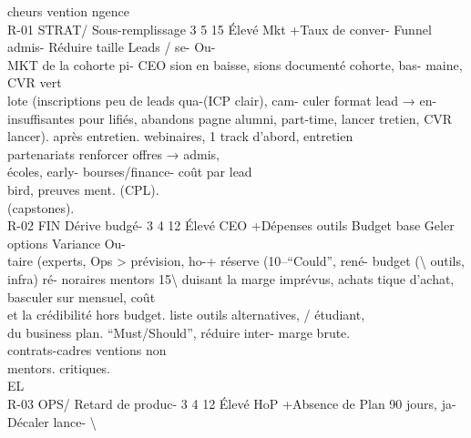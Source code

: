 \documentclass[12pt,landscape,a4paper]{article}
\begin{document}
cheurs           vention           ngence\\
R-01   STRAT/   Sous-remplissage 3 5 15 Élevé Mkt     +Taux de conver- Funnel      admis- Réduire      taille Leads / se- Ou-\\
MKT      de la cohorte pi-             CEO      sion en baisse, sions documenté cohorte,          bas- maine, CVR vert\\
lote (inscriptions                     peu de leads qua-(ICP clair), cam- culer      format lead → en-\\
insuffisantes pour                     lifiés, abandons pagne     alumni, part-time, lancer tretien, CVR\\
lancer).                               après entretien. webinaires,       1 track d’abord, entretien\\
partenariats       renforcer offres →        admis,\\
écoles,     early- bourses/finance- coût par lead\\
bird,    preuves ment.                (CPL).\\
(capstones).\\
R-02   FIN      Dérive      budgé- 3 4 12 Élevé CEO   +Dépenses outils Budget        base Geler       options Variance       Ou-\\
taire    (experts,              Ops    \textgreater{} prévision, ho-+ réserve (10–“Could”,            rené- budget (\textbackslash{}%
outils, infra) ré-                     noraires mentors 15\textbackslash{}%
duisant la marge                       imprévus, achats tique     d’achat, basculer        sur mensuel, coût\\
et la crédibilité                      hors budget.     liste       outils alternatives,       /   étudiant,\\
du business plan.                                       “Must/Should”, réduire          inter- marge brute.\\
contrats-cadres ventions          non\\
mentors.           critiques.\\
\vspace{0.5em}
\vspace{0.5em}
\vspace{0.5em}
\vspace{0.5em}
EL\\
R-03   OPS/    Retard de produc- 3 4 12 Élevé HoP     +Absence         de Plan 90 jours, ja- Décaler     lance- \textbackslash{}%
\end{document}
